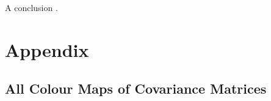 \documentclass[a4paper, 10pt, conference]{ieeeconf}
\begin{document}
A conclusion \cite{pca}.




\onecolumn
\section{Appendix} \label{sec:appendix}

\subsection{All Colour Maps of Covariance Matrices}
\end{document}
